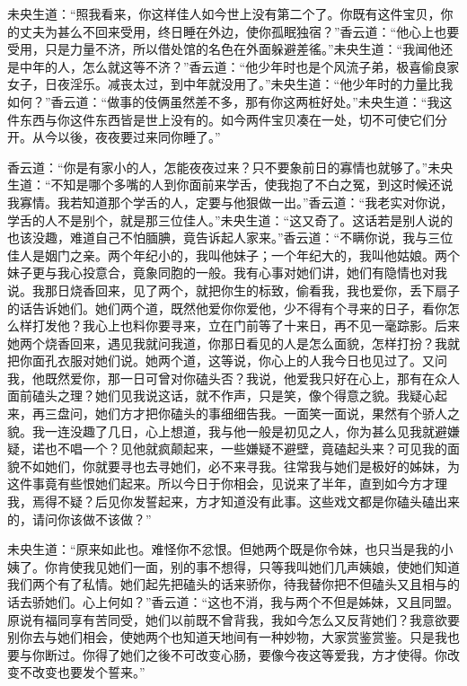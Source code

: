 \documentclass[a4paper,12pt,UTF8,twoside]{ctexbook}
\begin{document}
未央生道：“照我看来，你这样佳人如今世上没有第二个了。你既有这件宝贝，你的丈夫为甚么不回来受用，终日睡在外边，使你孤眠独宿？”香云道：“他心上也要受用，只是力量不济，所以借处馆的名色在外面躲避差徭。”未央生道：“我闻他还是中年的人，怎么就这等不济？”香云道：“他少年时也是个风流子弟，极喜偷良家女子，日夜淫乐。减丧太过，到中年就没用了。”未央生道：“他少年时的力量比我如何？”香云道：“做事的伎俩虽然差不多，那有你这两桩好处。”未央生道：“我这件东西与你这件东西皆是世上没有的。如今两件宝贝凑在一处，切不可使它们分开。从今以後，夜夜要过来同你睡了。”

香云道：“你是有家小的人，怎能夜夜过来？只不要象前日的寡情也就够了。”未央生道：“不知是哪个多嘴的人到你面前来学舌，使我抱了不白之冤，到这时候还说我寡情。我若知道那个学舌的人，定要与他狠做一出。”香云道：“我老实对你说，学舌的人不是别个，就是那三位佳人。”未央生道：“这又奇了。这话若是别人说的也该没趣，难道自己不怕腼腆，竟告诉起人家来。”香云道：“不瞒你说，我与三位佳人是姻门之亲。两个年纪小的，我叫他妹子；一个年纪大的，我叫他姑娘。两个妹子更与我心投意合，竟象同胞的一般。我有心事对她们讲，她们有隐情也对我说。我那日烧香回来，见了两个，就把你生的标致，偷看我，我也爱你，丢下扇子的话告诉她们。她们两个道，既然他爱你你爱他，少不得有个寻来的日子，看你怎么样打发他？我心上也料你要寻来，立在门前等了十来日，再不见一毫踪影。后来她两个烧香回来，遇见我就问我道，你那日看见的人是怎么面貌，怎样打扮？我就把你面孔衣服对她们说。她两个道，这等说，你心上的人我今日也见过了。又问我，他既然爱你，那一日可曾对你磕头否？我说，他爱我只好在心上，那有在众人面前磕头之理？她们见我说这话，就不作声，只是笑，像个得意之貌。我疑心起来，再三盘问，她们方才把你磕头的事细细告我。一面笑一面说，果然有个骄人之貌。我一连没趣了几日，心上想道，我与他一般是初见之人，你为甚么见我就避嫌疑，诺也不唱一个？见他就疯颠起来，一些嫌疑不避壁，竟磕起头来？可见我的面貌不如她们，你就要寻也去寻她们，必不来寻我。往常我与她们是极好的姊妹，为这件事竟有些恨她们起来。所以今日于你相会，见说来了半年，直到如今方才理我，焉得不疑？后见你发誓起来，方才知道没有此事。这些戏文都是你磕头磕出来的，请问你该做不该做？”

未央生道：“原来如此也。难怪你不忿恨。但她两个既是你令妹，也只当是我的小姨了。你肯使我见她们一面，别的事不想得，只等我叫她们几声姨娘，使她们知道我们两个有了私情。她们起先把磕头的话来骄你，待我替你把不但磕头又且相与的话去骄她们。心上何如？”香云道：“这也不消，我与两个不但是姊妹，又且同盟。原说有福同享有苦同受，她们以前既不曾背我，我如今怎么又反背她们？我意欲要别你去与她们相会，使她两个也知道天地间有一种妙物，大家赏鉴赏鉴。只是我也要与你断过。你得了她们之後不可改变心肠，要像今夜这等爱我，方才使得。你改变不改变也要发个誓来。”
\end{document}
